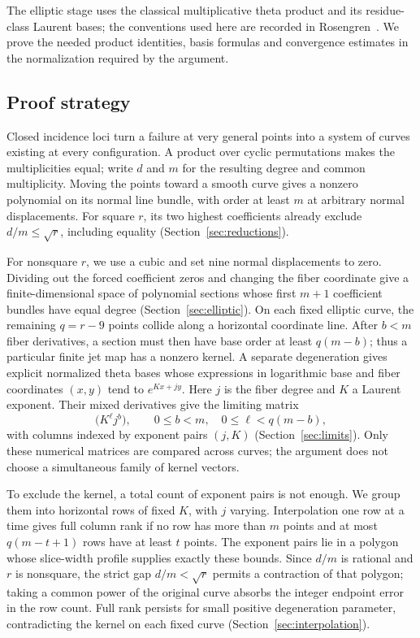 The elliptic stage uses the classical multiplicative theta product and
its residue-class Laurent bases; the conventions used here are recorded
in Rosengren~\cite[arXiv version, Section~1.2 and Exercise~1.6.5]{Rosengren2020}.
We prove the needed product identities, basis formulas and convergence
estimates in the normalization required by the argument.

\subsection{Proof strategy}

Closed incidence loci turn a failure at very general points into a
system of curves existing at every configuration. A product over cyclic
permutations makes the multiplicities equal; write $d$ and $m$ for the
resulting degree and common multiplicity. Moving the points toward a
smooth curve gives a nonzero polynomial on its normal line bundle,
with order at least $m$ at arbitrary normal displacements. For square
$r$, its two highest coefficients already exclude $d/m\le\sqrt r$,
including equality (Section~\ref{sec:reductions}).

For nonsquare $r$, we use a cubic and set nine normal displacements to
zero. Dividing out the forced coefficient zeros and changing the fiber
coordinate give a finite-dimensional space of polynomial sections whose
first $m+1$ coefficient bundles have equal degree
(Section~\ref{sec:elliptic}). On each fixed elliptic curve, the remaining
$q=r-9$ points collide along a horizontal coordinate line. After $b<m$
fiber derivatives, a section must then have base order at least $q(m-b)$;
thus a particular finite jet map has a nonzero kernel. A separate
degeneration gives explicit normalized theta bases whose expressions
in logarithmic base and fiber coordinates $(x,y)$ tend to $e^{Kx+jy}$.
Here $j$ is the fiber degree and $K$ a Laurent exponent. Their mixed
derivatives give the limiting matrix
\[
 \bigl(K^\ell j^b\bigr),\qquad
 0\le b<m,\quad 0\le\ell<q(m-b),
\]
with columns indexed by exponent pairs $(j,K)$
(Section~\ref{sec:limits}). Only these numerical matrices are compared
across curves; the argument does not choose a simultaneous family of
kernel vectors.

To exclude the kernel, a total count of exponent pairs is not enough.
We group them into horizontal rows of fixed $K$, with $j$ varying.
Interpolation one row at a time gives full column rank if no row has
more than $m$ points and at most $q(m-t+1)$ rows have at least $t$ points.
The exponent pairs lie in a polygon whose slice-width profile supplies
exactly these bounds. Since $d/m$ is rational and $r$ is nonsquare,
the strict gap $d/m<\sqrt r$ permits a contraction of that polygon;
taking a common power of the original curve absorbs the integer endpoint
error in the row count. Full rank persists for small positive degeneration
parameter, contradicting the kernel on each fixed curve
(Section~\ref{sec:interpolation}).
